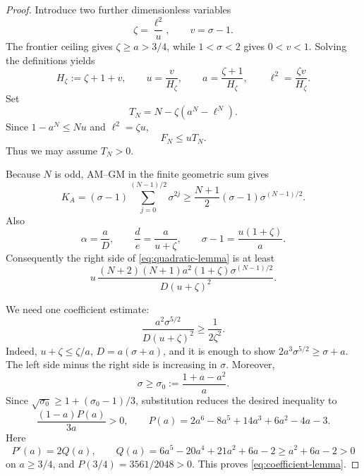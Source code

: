 \documentclass[11pt]{article}
\begin{document}
\begin{proof}
Introduce two further dimensionless variables
\begin{equation}\label{eq:zeta-v}
 \zeta=\frac{\ell^2}{u},\qquad v=\sigma-1.
\end{equation}
The frontier ceiling gives \(\zeta\ge a>3/4\), while
\(1<\sigma<2\) gives \(0<v<1\).  Solving the definitions yields
\begin{equation}\label{eq:zeta-param}
 H_\zeta:=\zeta+1+v,\qquad
 u=\frac v{H_\zeta},\qquad
 a=\frac{\zeta+1}{H_\zeta},\qquad
 \ell^2=\frac{\zeta v}{H_\zeta}.
\end{equation}
Set
\begin{equation}\label{eq:TN}
        T_N=N-\zeta(a^N-\ell^N).
\end{equation}
Since \(1-a^N\le Nu\) and \(\ell^2=\zeta u\),
\begin{equation}\label{eq:F-to-T}
        F_N\le uT_N.
\end{equation}
Thus we may assume \(T_N>0\).

Because \(N\) is odd, AM--GM in the finite geometric sum gives
\begin{equation}\label{eq:KA-amgm}
 K_A=(\sigma-1)\sum_{j=0}^{(N-1)/2}\sigma^{2j}
 \ge\frac{N+1}{2}(\sigma-1)\sigma^{(N-1)/2}.
\end{equation}
Also
\[
 \alpha=\frac aD,\qquad
 \frac d e=\frac{a}{u+\zeta},\qquad
 \sigma-1=\frac{u(1+\zeta)}a.
\]
Consequently the right side of \eqref{eq:quadratic-lemma} is at least
\begin{equation}\label{eq:quadratic-payment-lower}
 u\,\frac{(N+2)(N+1)a^2(1+\zeta)\sigma^{(N-1)/2}}
          {D(u+\zeta)^2}.
\end{equation}

We need one coefficient estimate:
\begin{equation}\label{eq:coefficient-lemma}
 \frac{a^2\sigma^{5/2}}{D(u+\zeta)^2}\ge\frac1{2\zeta^2}.
\end{equation}
Indeed, \(u+\zeta\le\zeta/a\), \(D=a(\sigma+a)\), and it is enough to
show \(2a^3\sigma^{5/2}\ge\sigma+a\).  The left side minus the right side
is increasing in \(\sigma\).  Moreover,
\[
 \sigma\ge\sigma_0:=\frac{1+a-a^2}{a}.
\]
Since \(\sqrt{\sigma_0}\ge1+(\sigma_0-1)/3\), substitution reduces the
desired inequality to
\[
 \frac{(1-a)P(a)}{3a}>0,\qquad
 P(a)=2a^6-8a^5+14a^3+6a^2-4a-3.
\]
Here
\[
 P'(a)=2Q(a),\qquad
 Q(a)=6a^5-20a^4+21a^2+6a-2
 \ge a^2+6a-2>0
\]
on \(a\ge3/4\), and \(P(3/4)=3561/2048>0\).  This proves
\eqref{eq:coefficient-lemma}.


\end{proof}
\end{document}
